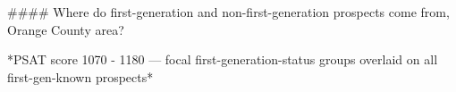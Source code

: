 #### Where do first-generation and non-first-generation prospects come from, Orange County area?

*PSAT score 1070 - 1180 — focal first-generation-status groups overlaid on all first-gen-known prospects*
